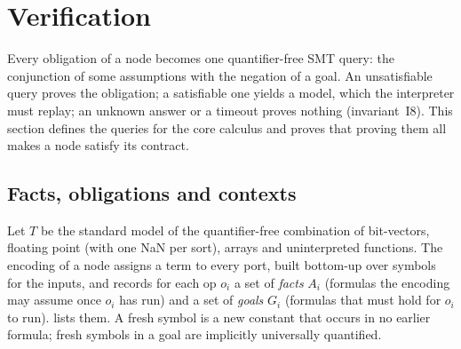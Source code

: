 \section{Verification}\label{sec:verification}

Every obligation of a \VG{} node becomes one quantifier-free SMT query: the conjunction of
some assumptions with the negation of a goal. An unsatisfiable query proves the obligation; a
satisfiable one yields a model, which the interpreter must replay; an unknown answer or a
timeout proves nothing (invariant~I8). This section defines the queries for the core calculus
and proves that proving them all makes a node satisfy its contract.

\subsection{Facts, obligations and contexts}

Let $T$ be the standard model of the quantifier-free combination of bit-vectors, floating point
(with one NaN per sort), arrays and uninterpreted functions. The encoding of a node assigns a
term to every port, built bottom-up over symbols for the inputs, and records for each op $o_i$
a set of \emph{facts} $A_i$ (formulas the encoding may assume once $o_i$ has run) and a set of
\emph{goals} $G_i$ (formulas that must hold for $o_i$ to run).  lists them. A
fresh symbol is a new constant that occurs in no earlier formula; fresh symbols in a goal are implicitly
universally quantified.

